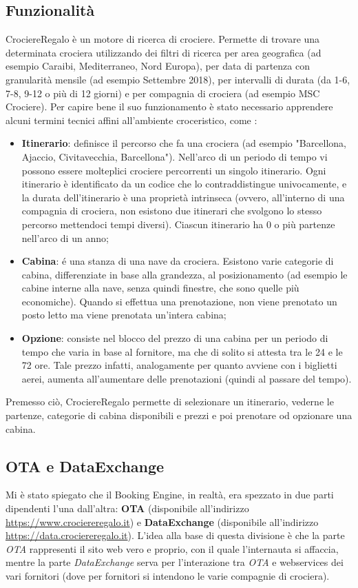 \subsection{Funzionalità}
CrociereRegalo è un motore di ricerca di crociere. Permette di trovare una determinata crociera utilizzando dei filtri di ricerca per area geografica (ad esempio Caraibi, Mediterraneo, Nord Europa), per data di partenza con granularità mensile (ad esempio Settembre 2018), per intervalli di durata (da 1-6, 7-8, 9-12 o più di 12 giorni) e per compagnia di crociera (ad esempio MSC Crociere). Per capire bene il suo funzionamento è stato necessario apprendere alcuni termini tecnici affini all'ambiente croceristico, come :
\begin{itemize}
	\item \textbf{Itinerario}: definisce il percorso che fa una crociera (ad esempio "Barcellona, Ajaccio, Civitavecchia, Barcellona"). Nell'arco di un periodo di tempo vi possono essere molteplici crociere percorrenti un singolo itinerario. Ogni itinerario è identificato da un codice che lo contraddistingue univocamente, e la durata dell'itinerario è una proprietà intrinseca (ovvero, all'interno di una compagnia di crociera, non esistono due itinerari che svolgono lo stesso percorso mettendoci tempi diversi). Ciascun itinerario ha 0 o più partenze nell'arco di un anno;
	\item \textbf{Cabina}: é una stanza di una nave da crociera. Esistono varie categorie di cabina, differenziate in base alla grandezza, al posizionamento (ad esempio le cabine interne alla nave, senza quindi finestre, che sono quelle più economiche). Quando si effettua una prenotazione, non viene prenotato un posto letto ma viene prenotata un'intera cabina;
	\item \textbf{Opzione}: consiste nel blocco del prezzo di una cabina per un periodo di tempo che varia in base al fornitore, ma che di solito si attesta tra le 24 e le 72 ore. Tale prezzo infatti, analogamente per quanto avviene con i biglietti aerei, aumenta all'aumentare delle prenotazioni (quindi al passare del tempo).

\end{itemize}
Premesso ciò, CrociereRegalo permette di selezionare un itinerario, vederne le partenze, categorie di cabina disponibili e prezzi e poi prenotare od opzionare una cabina. 

\subsection{OTA e DataExchange}
Mi è stato spiegato che il Booking Engine, in realtà, era spezzato in due parti dipendenti l'una dall'altra: \textbf{OTA} (disponibile all'indirizzo \url{https://www.crociereregalo.it}) e \textbf{DataExchange} (disponibile all'indirizzo \url{https://data.crociereregalo.it}). L'idea alla base di questa divisione è che la parte \textit{OTA} rappresenti il sito web vero e proprio, con il quale l'internauta si affaccia, mentre la parte \textit{DataExchange} serva per l'interazione tra \textit{OTA} e \glspl{webservice} dei vari fornitori (dove per fornitori si intendono le varie compagnie di crociera). 

